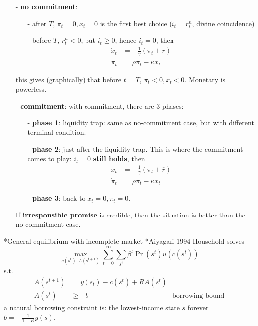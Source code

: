 \documentclass[10pt,landscape,a4paper]{article}
\makeatletter
\let\bar\overline
\renewcommand{\section}{\@startsection{section}{1}{0mm}{1ex}{.2ex}{\normalsize\bfseries}}
\renewcommand{\subsection}{\@startsection{subsection}{1}{0mm}{.2ex}{.2ex}{\small\bfseries}}
\makeatother
\begin{document}
\begin{multicols*}{3}
\begin{itemize}
\begin{itemize}
    \item[-] \textbf{\color{myred}no commitment}:
    \begin{itemize}
        \item[-] after $T$, $\pi_t=0,x_t=0$ is the first best choice ($i_t = r^n_t$, divine coincidence)
        \item[-] before $T$, $r^n_t<0$, but $i_t\geq 0$, hence $i_t=0$, then
        \begin{align*}
            \dot{x}_t &= -\frac{1}{\gamma}(\pi_t +\underline{r})\\
            \dot{\pi}_t &= \rho \pi_t -\kappa x_t
        \end{align*}
    \end{itemize}
    this gives (graphically) that before $t=T$, $\pi_t<0,x_t<0$. Monetary is powerless.
    \item[-] \textbf{\color{myred}commitment}: with commitment, there are 3 phases:
    \begin{itemize}
        \item[-] \textbf{phase 1}: liquidity trap: same as no-commitment case, but with different terminal condition.
        \item[-] \textbf{phase 2}: just after the liquidity trap. This is where the commitment comes to play: $i_t=0$ \textbf{still holds}, then
        \begin{align*}
            \dot{x}_t &= -\frac{1}{\gamma}(\pi_t +\bar{r})\\
            \dot{\pi}_t &= \rho \pi_t -\kappa x_t
        \end{align*}
        \item[-] \textbf{phase 3}: back to $x_t=0,\pi_t=0$.
    \end{itemize}
    If \textbf{irresponsible promise} is credible, then the situation is better than the no-commitment case.
\end{itemize}
\end{itemize}

\section*{General equilibrium with incomplete market}
\subsection*{Aiyagari 1994}
Household solves
$$
\max_{c(s^t),A(s^{t+1})}\sum^{\infty}_{t=0}\sum_{s^t}\beta^t \Pr(s^t)u(c(s^t))
$$
s.t.
\begin{align*}
    A(s^{t+1}) &= y(s_t)-c(s^t) +RA(s^t) \\
    A(s^t) &\geq -b & \text{borrowing bound}
\end{align*}
a natural borrowing constraint is: the lowest-income state $\underline{s}$ forever $b = -\frac{1}{1-R}y(\underline{s})$. 


\end{multicols*}
\end{document}
